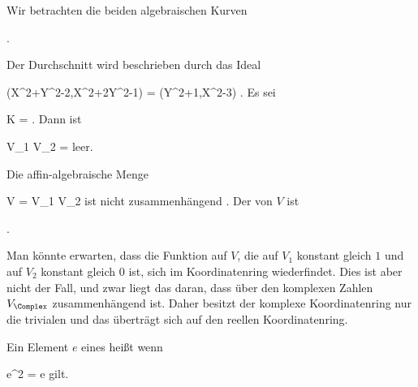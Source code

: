 {





Wir betrachten  {} {} die beiden algebraischen Kurven

 { . }

Der Durchschnitt wird beschrieben durch das Ideal

\mavergleichskettedisp
{\vergleichskette
{ (X^2+Y^2-2,X^2+2Y^2-1)
}
{ =} { (Y^2+1,X^2-3)
}
{ } {
}
{ } {
}
{ } {
}
}
{}{}{.}
Es sei

\mavergleichskette
{\vergleichskette
{ K
}
{ = }{ \R
}
{  }{
}
{    }{
}
{   }{
}
}
{}{}{.}
Dann ist

\mavergleichskette
{\vergleichskette
{ V_1 \cap V_2
}
{ = }{ \emptyset
}
{  }{
}
{    }{
}
{   }{
}
}
{}{}{}
leer.

Die affin-algebraische Menge

\mavergleichskette
{\vergleichskette
{ V
}
{ = }{ V_1 \cup V_2
}
{  }{
}
{    }{
}
{   }{
}
}
{}{}{}
ist nicht zusammenhängend
 {} {.}
Der
von $V$ ist

 { . }

Man könnte erwarten, dass die Funktion auf $V$, die auf $V_1$ konstant gleich $1$ und auf $V_2$ konstant gleich $0$ ist, sich im Koordinatenring wiederfindet. Dies ist aber nicht der Fall, und zwar liegt das daran, dass über den komplexen Zahlen $V_{\Complex}$ zusammenhängend ist. Daher besitzt der komplexe Koordinatenring nur die trivialen
und das überträgt sich auf den reellen Koordinatenring.





}


{}
{





Ein Element $e$ eines
heißt  wenn

\mavergleichskette
{\vergleichskette
{e^2
}
{ = }{ e
}
{  }{
}
{    }{
}
{   }{
}
}
{}{}{}
gilt.





}

